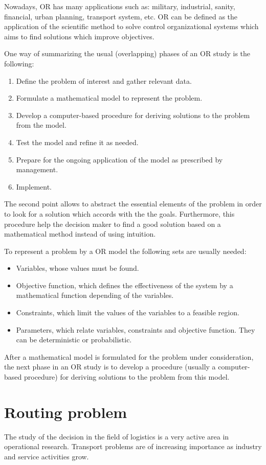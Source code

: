 Nowadays, OR has many applications such as: military, industrial, sanity, financial, urban planning, transport system, etc. OR can be defined as the application of the scientific method to solve control organizational systems which aims to find solutions which improve objectives. 

One way of summarizing the usual (overlapping) phases of an OR study is the following:
\begin{enumerate}
	\item Define the problem of interest and gather relevant data.
	\item Formulate a mathematical model to represent the problem.
	\item Develop a computer-based procedure for deriving solutions to the problem from the
	model.
	\item Test the model and refine it as needed.
	\item Prepare for the ongoing application of the model as prescribed by management.
	\item Implement.
\end{enumerate}

The second point allows to abstract the essential elements of the problem in order to look for a solution which accords with the the goals. Furthermore, this procedure help the decision maker to find a good solution based on a mathematical method instead of using intuition.

To represent a problem by a OR model the following sets are usually needed:
\begin{itemize}
	\item Variables, whose values must be found.
	\item Objective function, which defines the effectiveness of the system by a mathematical function depending of the variables.
	\item Constraints, which limit the values of the variables to a feasible region.
	\item Parameters, which relate variables, constraints and objective function. They can be deterministic or probabilistic.
\end{itemize}

After a mathematical model is formulated for the problem under consideration, the next
phase in an OR study is to develop a procedure (usually a computer-based procedure) for
deriving solutions to the problem from this model. 



\section{Routing problem}
The study of the decision in the field of logistics is a very active area in operational research. Transport problems are of increasing importance as industry and service activities grow. 

